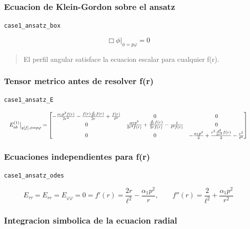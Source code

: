\documentclass[11pt,a4paper]{article}
\begin{document}
\subsubsection{Ecuacion de Klein-Gordon sobre el ansatz}

\noindent\texttt{case1\_ansatz\_box}\par\nopagebreak[4]

\[
\Box\phi\big|_{\phi=p\varphi} = 0
\]

\begin{quote}\small El perfil angular satisface la ecuacion escalar para cualquier f(r).\end{quote}

\subsubsection{Tensor metrico antes de resolver f(r)}

\noindent\texttt{case1\_ansatz\_E}\par\nopagebreak[4]

\[
\resizebox{\textwidth}{!}{$\displaystyle E^{(1)}_{ab}\big|_{g[f],\phi=p\varphi} = \left[\begin{matrix}- \frac{\alpha_{1} p^{2} f{\left(r \right)}}{2 r^{2}} - \frac{f{\left(r \right)} \frac{d}{d r} f{\left(r \right)}}{2 r} + \frac{f{\left(r \right)}}{\ell^{2}} & 0 & 0\\0 & \frac{\alpha_{1} p^{2}}{2 r^{2} f{\left(r \right)}} + \frac{\frac{d}{d r} f{\left(r \right)}}{2 r f{\left(r \right)}} - \frac{1}{\ell^{2} f{\left(r \right)}} & 0\\0 & 0 & - \frac{\alpha_{1} p^{2}}{2} + \frac{r^{2} \frac{d^{2}}{d r^{2}} f{\left(r \right)}}{2} - \frac{r^{2}}{\ell^{2}}\end{matrix}\right]$}
\]

\subsubsection{Ecuaciones independientes para f(r)}

\noindent\texttt{case1\_ansatz\_odes}\par\nopagebreak[4]

\[
E_{\tau\tau}=E_{rr}=E_{\varphi\varphi}=0 = f'(r)=\frac{2r}{\ell^2}-\frac{\alpha_1p^2}{r},\qquad f''(r)=\frac{2}{\ell^2}+\frac{\alpha_1p^2}{r^2}
\]

\subsubsection{Integracion simbolica de la ecuacion radial}
\end{document}
